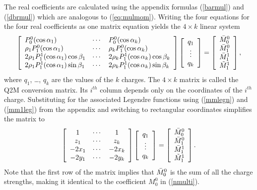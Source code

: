 The real coefficients are calculated using the %
appendix formulas
(\ref{barmul}) and (\ref{dbrmul}) which
are analogous to (\ref{eq:mulmom}). Writing the four equations for the 
four real coefficients as one matrix equation yields the $4\times k$ linear system
\begin{equation}
\left[
\begin{array}{lcl}
P_0^0(\cos\alpha_1)&
\cdots &
P_0^0(\cos\alpha_k)
\\
\rho_1 P_1^0(\cos\alpha_1)&
\cdots &
\rho_k P_1^0(\cos\alpha_k)
\\
2 \rho_1 P_1^1(\cos\alpha_1) \cos\beta_1&
\cdots &
2 \rho_k P_1^1(\cos\alpha_k) \cos\beta_k
\\
2 \rho_1 P_1^1(\cos\alpha_1) \sin\beta_1&
\cdots &
2 \rho_k P_1^1(\cos\alpha_k) \sin\beta_k
\end{array}
\right]
\left[
\begin{array}{c}
q_1\\
\vdots\\q_k
\end{array}
\right]
=
\left[
\begin{array}{c}
\mbox{$\bar{M}_{0}^{0}$}\\ \mbox{$\bar{M}_{1}^{0}$}\\ \mbox{$\bar{M}_{1}^{1}$}\\ \mbox{$\tilde{M}_{1}^{1}$}
\end{array}
\right],
\end{equation}
where $q_1$, \ldots, $q_k$ are the values of the $k$ charges.
The $4\times k$ matrix is called the Q2M conversion matrix. Its $i^{th}$
column depends only on the coordinates of the $i^{th}$ charge.
Substituting for the associated Legendre functions using (\ref{mmlegn})
and (\ref{mm1leg}) from  %
the appendix and switching to
rectangular coordinates simplifies the matrix to
\begin{equation}
\left[
\begin{array}{ccc}
1&
\cdots &
1
\\
z_1&
\cdots &
z_k
\\
-2 x_1&
\cdots &
-2 x_k
\\
-2 y_1&
\cdots &
-2 y_k
\end{array}
\right]
\left[
\begin{array}{c}
q_1\\
\vdots\\q_k
\end{array}
\right]
=
\left[
\begin{array}{c}
\mbox{$\bar{M}_{0}^{0}$}\\ \mbox{$\bar{M}_{1}^{0}$}\\ \mbox{$\bar{M}_{1}^{1}$}\\ \mbox{$\tilde{M}_{1}^{1}$}
\end{array}
\right].
\end{equation}
Note that the first row of the matrix implies that $\mbox{$\bar{M}_{0}^{0}$}$ is
the sum of all the charge strengths, making it identical to the
coefficient $M_0^0$ in (\ref{nmulti}).

